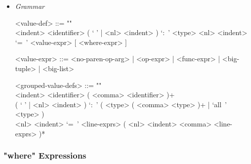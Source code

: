 \documentclass{article}
\begin{document}
\begin{itemize}
\item \textit{Grammar}
\begin{grammar}
<value-def> ::= ""\\
<indent> <identifier> 
( ` ' | <nl> <indent> ) `:\ ' <type> 
<nl> <indent> `=\ ' <value-expr> [ <where-expr> ]

<value-expr> ::=
<no-paren-op-arg> | <op-expr> | <func-expr> | <big-tuple> | <big-list>

<grouped-value-defs> ::= ""\\
<indent> <identifier> ( <comma> <identifier> )+ \\
( ` ' | <nl> <indent> ) `:\ ' ( <type> ( <comma> <type> )+ | `all\ ' <type> ) \\
<nl> <indent> `=\ ' <line-exprs> ( <nl> <indent> <comma> <line-exprs> )*
\end{grammar}

\end{itemize}

\subsubsection{"where" Expressions}
\end{document}
